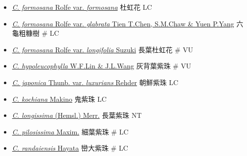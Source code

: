\begin{itemize}
  \begin{itemize}
        \item[] \href{http://www.theplantlist.org/tpl1.1/search?q=Callicarpa+formosana+var.+formosana}{\textit{C. formosana} Rolfe var. \textit{formosana}}   杜虹花   LC
        \item[] \href{http://www.theplantlist.org/tpl1.1/search?q=Callicarpa+formosana+var.+glabrata}{\textit{C. formosana} Rolfe var. \textit{glabrata} Tien T.Chen, S.M.Chaw \& Yuen P.Yang}   六龜粗糠樹  \# LC
        \item[] \href{http://www.theplantlist.org/tpl1.1/search?q=Callicarpa+formosana+var.+longifolia}{\textit{C. formosana} Rolfe var. \textit{longifolia} Suzuki}   長葉杜虹花  \# VU
        \item[] \href{http://www.theplantlist.org/tpl1.1/search?q=Callicarpa+hypoleucophylla}{\textit{C. hypoleucophylla} W.F.Lin \& J.L.Wang}   灰背葉紫珠  \# VU
        \item[] \href{http://www.theplantlist.org/tpl1.1/search?q=Callicarpa+japonica+var.+luxurians}{\textit{C. japonica} Thunb. var. \textit{luxurians} Rehder}   朝鮮紫珠   LC
        \item[] \href{http://www.theplantlist.org/tpl1.1/search?q=Callicarpa+kochiana}{\textit{C. kochiana} Makino}   鬼紫珠   LC
        \item[] \href{http://www.theplantlist.org/tpl1.1/search?q=Callicarpa+longissima}{\textit{C. longissima} (Hemsl.) Merr.}   長葉紫珠   NT
        \item[] \href{http://www.theplantlist.org/tpl1.1/search?q=Callicarpa+pilosissima}{\textit{C. pilosissima} Maxim.}   細葉紫珠  \# LC
        \item[] \href{http://www.theplantlist.org/tpl1.1/search?q=Callicarpa+randaiensis}{\textit{C. randaiensis} Hayata}   巒大紫珠  \# LC

\end{itemize}
\end{itemize}
